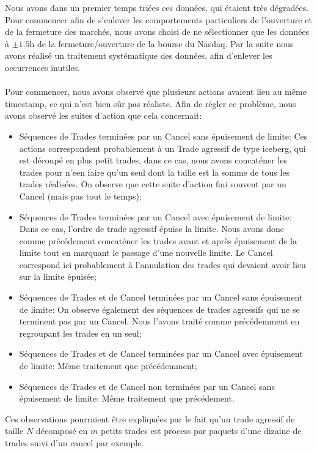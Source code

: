 \documentclass[12pt,a4paper]{article}
\theoremstyle{definition}
\theoremstyle{remark}
\begin{document}
Nous avons dans un premier temps triées ces données, qui étaient très dégradées. Pour commencer afin de s'enlever les comportements particuliers de l'ouverture et de la fermeture des marchés, nous avons choisi de ne sélectionner que les données à $\pm1.5$h de la fermeture/ouverture de la bourse du Nasdaq. Par la suite nous avons réalisé un traitement systématique des données, afin d'enlever les occurrences inutiles.
\\
\\
Pour commencer, nous avons observé que plusieurs actions avaient lieu au même timestamp, ce qui n'est bien sûr pas réaliste. Afin de régler ce problème, nous avons observé les suites d'action que cela concernait:
\begin{itemize}
\item Séquences de Trades terminées par un Cancel sans épuisement de limite: Ces actions correspondent probablement à un Trade agressif de type iceberg, qui est découpé en plus petit trades, dans ce cas, nous avons concaténer les trades pour n'een faire qu'un seul dont la taille est la somme de tous les trades réalisées. On observe que cette suite d'action fini souvent par un Cancel (mais pas tout le temps);
\item Séquences de Trades terminées par un Cancel avec épuisement de limite: Dans ce cas, l'ordre de trade agressif épuise la limite. Nous avons donc comme précédement concaténer les trades avant et après épuisement de la limite tout en marquant le passage d'une nouvelle limite. Le Cancel correspond ici probablement à l'annulation des trades qui devaient avoir lieu sur la limite épuisée;
\item Séquences de Trades et de Cancel terminées par un Cancel sans épuisement de limite: On observe également des séquences de trades agressifs qui ne se terminent pas par un Cancel. Nous l'avons traité comme précédemment en regroupant les trades en un seul;
\item Séquences de Trades et de Cancel terminées par un Cancel avec épuisement de limite: Même traitement que précédemment;
\item Séquences de Trades et de Cancel non terminées par un Cancel sans épuisement de limite: Même traitement que précédement.
\end{itemize}
Ces observations pourraient être expliquées par le fait qu'un trade agressif de taille $N$ décomposé en $m$ petits trades est process par paquets d'une dizaine de trades suivi d'un cancel par exemple.
\\
\\
\end{document}

